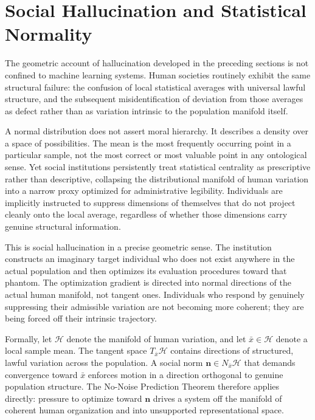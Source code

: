 \documentclass[11pt,a4paper,twocolumn]{article}
\begin{document}

\section{Social Hallucination and Statistical Normality}

The geometric account of hallucination developed in the preceding
sections is not confined to machine learning systems. Human societies
routinely exhibit the same structural failure: the confusion of local
statistical averages with universal lawful structure, and the
subsequent misidentification of deviation from those averages as
defect rather than as variation intrinsic to the population manifold
itself.

A normal distribution does not assert moral hierarchy. It describes
a density over a space of possibilities. The mean is the most
frequently occurring point in a particular sample, not the most
correct or most valuable point in any ontological sense. Yet social
institutions persistently treat statistical centrality as prescriptive
rather than descriptive, collapsing the distributional manifold of
human variation into a narrow proxy optimized for administrative
legibility. Individuals are implicitly instructed to suppress
dimensions of themselves that do not project cleanly onto the local
average, regardless of whether those dimensions carry genuine
structural information.

This is social hallucination in a precise geometric sense. The
institution constructs an imaginary target individual who does not
exist anywhere in the actual population and then optimizes its
evaluation procedures toward that phantom. The optimization gradient
is directed into normal directions of the actual human manifold, not
tangent ones. Individuals who respond by genuinely suppressing
their admissible variation are not becoming more coherent; they are
being forced off their intrinsic trajectory.

Formally, let $\mathcal{H}$ denote the manifold of human variation,
and let $\bar{x} \in \mathcal{H}$ denote a local sample mean. The
tangent space $T_{\bar{x}} \mathcal{H}$ contains directions of
structured, lawful variation across the population. A social norm
$\mathbf{n} \in N_{\bar{x}} \mathcal{H}$ that demands convergence
toward $\bar{x}$ enforces motion in a direction orthogonal to
genuine population structure. The No-Noise Prediction Theorem
therefore applies directly: pressure to optimize toward
$\mathbf{n}$ drives a system off the manifold of coherent human
organization and into unsupported representational space.
\end{document}
